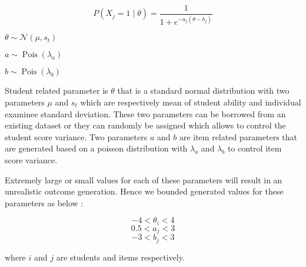 
\newcommand\pN{\mathcal{N}}

\begin{equation}
P(X_j\!=\!1\;|\;\theta) = \frac{1}{1+e^{-a_j(\theta-b_j)}}
\label{IRTEQ}
\end{equation}

\begin{center}
$\theta \sim \pN(\mu, s_t)$

$a \sim \operatorname{Pois} \left({\lambda_a}\right)$

$b \sim \operatorname{Pois} \left({\lambda_b}\right)$
\end{center}


Student related parameter is $\theta$ that is a standard normal distribution with two parameters $\mu$ and $s_t$ which are respectively mean of student ability and individual examinee standard deviation. These two parameters can be borrowed from an existing dataset or they can randomly be assigned which allows to control the student score variance. Two parameters $a$ and $b$ are item related parameters that are generated based on a poisson distribution with $\lambda_a$ and $\lambda_b$ to control item score variance.

Extremely large or small values for each of these parameters will result in an unrealistic outcome generation. Hence we bounded generated values for these parameters as below :

\begin{center}
\[-4 < \theta_i < 4\]
\[0.5 < a_j < 3\]
\[-3 < b_j < 3\]
\end{center}
where $i$ and $j$ are students and items respectively.

